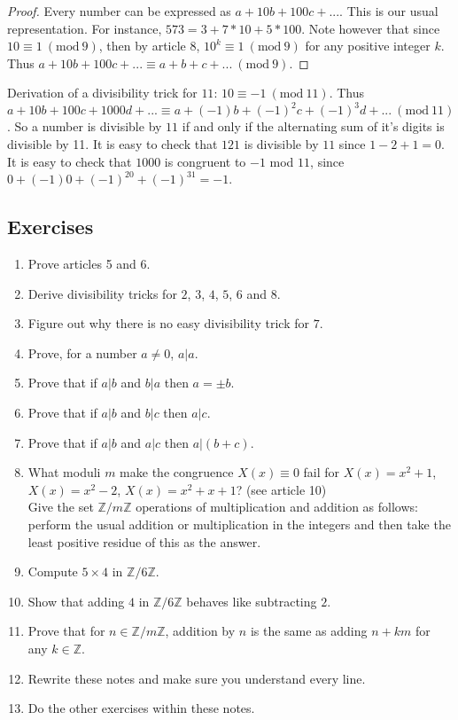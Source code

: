 \documentclass{article}
\theoremstyle{problemstyle}
\newcommand{\Mod}[1]{\ (\mathrm{mod}\ #1)}
\begin{document}
\begin{proof}
Every number can be expressed as $a + 10b + 100c + ...$. This is our usual representation. For instance, $573  = 3 + 7*10 + 5*100$. Note however that since $10 \equiv 1 \Mod{9}$, then by article 8,  $10^k \equiv 1 \Mod{9}$ for any positive integer $k$. Thus $a + 10b + 100c + ... \equiv a+b+c+... \Mod{9}$.
\end{proof}

Derivation of a divisibility trick for $11$: 
$10 \equiv -1 \Mod{11}$. Thus $a + 10b + 100c + 1000d + ... \equiv a+(-1)b+(-1)^2c+(-1)^3d+... \Mod{11}$. So a number is divisible by $11$ if and only if the alternating sum of it's digits is divisible by 11. It is easy to check that $121$ is divisible by $11$ since $1-2+1 = 0$. It is easy to check that $1000$ is congruent to $-1$ mod $11$, since $0+(-1)0+(-1)^20+(-1)^31 = -1$.  

\subsection*{Exercises}
\begin{enumerate}
\item Prove articles 5 and 6. 
\item Derive divisibility tricks for $2$, $3$, $4$, $5$, $6$ and $8$. 
\item Figure out why there is no easy divisibility trick for $7$. 
\item Prove, for a number $a \neq 0$, $a|a$. 
\item Prove that if $a|b$ and $b|a$ then $a = \pm b$. 
\item Prove that if $a|b$ and $b|c$ then $a|c$.  
\item Prove that if $a|b$ and $a|c$ then $a|(b+c)$. 
\item What moduli $m$ make the congruence $X(x) \equiv 0$ fail for $X(x) = x^2+1$, $X(x) = x^2-2$, $X(x) = x^2+x+1$? (see article 10)\vspace{1mm}\\
Give the set $\mathbb{Z}/m\mathbb{Z}$ operations of multiplication and addition as follows: perform the usual addition or multiplication in the integers and then take the least positive residue of this as the answer. 
\item Compute $5 \times 4$ in $\mathbb{Z}/6\mathbb{Z}$. 
\item Show that adding $4$ in $\mathbb{Z}/6\mathbb{Z}$ behaves like subtracting $2$.
\item Prove that for $n \in \mathbb{Z}/m\mathbb{Z}$, addition by $n$ is the same as adding $n+km$ for any $k \in \mathbb{Z}$. 
\item Rewrite these notes and make sure you understand every line. 
\item Do the other exercises within these notes. 

\end{enumerate}
\end{document}
